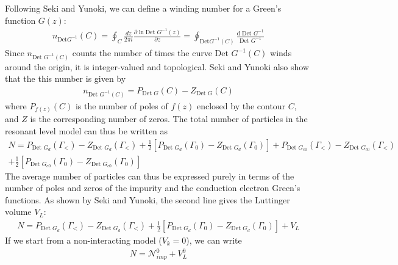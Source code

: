 \documentclass{report}
\numberwithin{equation}{section}
\begin{document}
Following Seki and Yunoki, we can define a winding number for a Green's function \(G(z)\):
\begin{equation}\begin{aligned}
	n_{\text{Det} G^{-1}}(C) = \oint_{C} \frac{dz}{2\pi i} \frac{\partial{\ln\text{Det }G^{-1}(z)}}{\partial{z}} = \oint_{\text{Det} G^{-1}(C)} \frac{\mathrm{d}\; \text{Det }G^{-1}}{\text{Det }G^{-1}}
\end{aligned}\end{equation}
Since \(n_{\text{Det } G^{-1}(C)}\) counts the number of times the curve \(\text{Det } G^{-1}(C)\) winds around the origin, it is integer-valued and topological. Seki and Yunoki also show that the this number is given by
\begin{equation}\begin{aligned}
n_{\text{Det }G^{-1}(C)} = P_{\text{Det }G}(C) - Z_{\text{Det }G}(C)
\end{aligned}\end{equation}
where \(P_{f(z)}(C)\) is the number of poles of \(f(z)\) enclosed by the contour \(C\), and \(Z\) is the corresponding number of zeros. The total number of particles in the resonant level model can thus be written as
\begin{equation}\begin{aligned}
	N = P_{\text{Det }G_d}(\Gamma_<) - Z_{\text{Det }G_d}(\Gamma_<) + \frac{1}{2}\left[P_{\text{Det }G_d}(\Gamma_0) - Z_{\text{Det }G_d}(\Gamma_0)\right] + P_{\text{Det }G_{c0}}(\Gamma_<) - Z_{\text{Det }G_{c0}}(\Gamma_<) \\
	+ \frac{1}{2}\left[P_{\text{Det }G_{c0}}(\Gamma_0) - Z_{\text{Det }G_{c0}}(\Gamma_0)\right]
\end{aligned}\end{equation}
The average number of particles can thus be expressed purely in terms of the number of poles and zeros of the impurity and the conduction electron Green's functions. As shown by Seki and Yunoki, the second line gives the Luttinger volume \(V_L\):
\begin{equation}\begin{aligned}
	\label{total_lutt}
	N = P_{\text{Det }G_d}(\Gamma_<) - Z_{\text{Det }G_d}(\Gamma_<) + \frac{1}{2}\left[P_{\text{Det }G_d}(\Gamma_0) - Z_{\text{Det }G_d}(\Gamma_0)\right] + V_L
\end{aligned}\end{equation}
If we start from a non-interacting model (\(V_k = 0\)), we can write
\begin{equation}\begin{aligned}
	N = \mathcal{N}^0_{imp} + V_L^0
\end{aligned}\end{equation}
\end{document}
